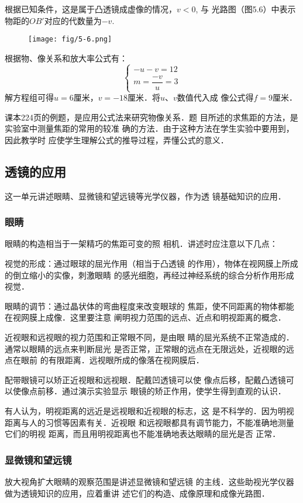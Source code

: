 根据已知条件，这是属于凸透镜成虚像的情况，$v<0$, 与
光路图（图5.6）中表示物距的$OB'$对应的代数量为$-v$.
\begin{figure}[htp]
    \centering
    \texttt{[image: fig/5-6.png]}
    \caption{}
\end{figure}

根据物、像关系和放大率公式有：
\[\begin{cases}
    -u-v=12\\
    m=\dfrac{-v}{u}=3
\end{cases}\]
解方程组可得$u=6$厘米，$v=-18$厘米．将$u$、$v$数值代入成
像公式得$f=9$厘米．

课本224页的例题，是应用公式法来研究物像关系．题
目所述的求焦距的方法，是实验室中测量焦距的常用的较准
确的方法．由于这种方法在学生实验中要用到，因此教学时
应使学生理解公式的推导过程，弄懂公式的意义．

\subsection{透镜的应用}
这一单元讲述眼睛、显微镜和望远镜等光学仪器，作为透
镜基础知识的应用．

\subsubsection{眼睛}

眼睛的构造相当于一架精巧的焦距可变的照
相机．讲述时应注意以下几点：

视觉的形成：通过眼球的屈光作用（相当于凸透镜
的作用），物体在视网膜上所成的倒立缩小的实像，刺激眼睛
的感光细胞，再经过神经系统的综合分析作用形成视觉．

眼睛的调节：通过晶状体的弯曲程度来改变眼球的
焦距，使不同距离的物体都能在视网膜上成像．这里要注意
阐明视力范围的远点、近点和明视距离的概念．

近视眼和远视眼的视力范围和正常眼不同，是由眼
睛的屈光系统不正常造成的．通常以眼睛的远点来判断屈光
是否正常，正常眼的远点在无限远处，近视眼的远点在眼前
的有限距离．远视眼所成的像落在视网膜后．

配带眼镜可以矫正近视眼和远视眼．配戴凹透镜可以使
像点后移，配戴凸透镜可以使像点前移．通过演示实验显示
眼镜的矫正作用，使学生得到直观的认识．

有人认为，明视距离的远近是远视眼和近视眼的标志，这
是不科学的．因为明视距离与人的习惯等因素有关．近视眼
和远视眼都具有调节能力，不能准确地测量它们的明视
距离，而且用明视距离也不能准确地表达眼睛的屈光是否
正常．

\subsubsection{显微镜和望远镜}
放大视角扩大眼睛的观察范围是讲述显微镜和望远镜
的主线．这些助视光学仪器做为透镜知识的应用，应着重讲
述它们的构造、成像原理和成像光路图．

